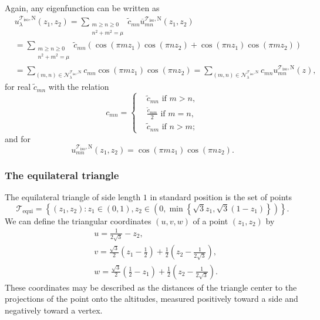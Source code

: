 \documentclass{amsart}
\theoremstyle{definition}
\theoremstyle{remark}
\renewcommand\geq\geqslant
\numberwithin{equation}{section}
\theoremstyle{definition}
\theoremstyle{remark}
\begin{document}
Again, any eigenfunction can be written as 
\begin{equation}
	\begin{aligned}
		&u_\lambda^{\mathcal{T}_\mathrm{iso},\mathrm{N}}(z_1,z_2)=\sum_{\substack{m \geq n\geq 0 \\ n^2+m^2=\mu}}\tilde{c}_{mn}	\overline{u}_{mn}^{\mathcal{T}_\mathrm{iso},\mathrm{N}}(z_1, z_2)\\&=\sum_{\substack{m \geq n\geq 0 \\ n^2+m^2=\mu}}\tilde{c}_{mn}(\cos (\pi m z_1) \cos (\pi n z_2)+\cos (\pi n z_1) \cos (\pi m z_2))
		\\&	=\sum_{(m,n)\in\mathcal{N}_\lambda^{\mathcal{T}_\mathrm{iso},\mathrm{N}}}c_{mn}\cos (\pi m z_1) \cos (\pi n z_2)=\sum_{(m,n)\in\mathcal{N}_\lambda^{\mathcal{T}_\mathrm{iso},\mathrm{N}}}c_{mn}u_{mn}^{\mathcal{T}_\mathrm{iso},\mathrm{N}}(z),
	\end{aligned}
\end{equation}for real $\tilde{c}_{mn}$ with the relation \begin{equation}\label{condN}
	c_{mn}=\left\{\begin{aligned}
		&\tilde{c}_{mn}\text{ if }m>n,
		\\& \frac{\tilde{c}_{mm}}{2}\text{ if }m=n,
		\\& \tilde{c}_{nm}\text{ if }n>m;
	\end{aligned}\right.
\end{equation}and for 
\begin{equation}
	u_{mn}^{\mathcal{T}_\mathrm{iso},\mathrm{N}}(z_1,z_2)=\cos (\pi m z_1) \cos (\pi n z_2).
\end{equation}

\subsubsection{The equilateral triangle}\label{equi}
The equilateral triangle of side length $1$ in standard position is the set of points \begin{equation}
	\mathcal{T}_\mathrm{equi}=	\left\{(z_1,z_2):z_1\in (0,1), z_2\in\left(0,\min\left\{\sqrt{3}z_1,\sqrt{3}(1-z_1)\right\}\right)\right\}.
\end{equation}We can define the triangular coordinates $(u,v,w)$ of a point $(z_1,z_2)$ by
\begin{equation}
	\begin{aligned}	&u=\frac{1}{2\sqrt{3}}-z_2,
		\\&v=\frac{\sqrt{3}}{2}\left(z_1-\frac{1}{2}\right)+\frac{1}{2}\left(z_2-\frac{1}{2\sqrt{3}}\right),
		\\&w=\frac{\sqrt{3}}{2}\left(\frac{1}{2}-z_1\right)+\frac{1}{2}\left(z_2-\frac{1}{2\sqrt{3}}\right).
	\end{aligned}
\end{equation}
These coordinates may be described as the distances of the triangle center to the projections of the point onto the altitudes, measured positively toward a side and negatively toward a vertex.
\end{document}
